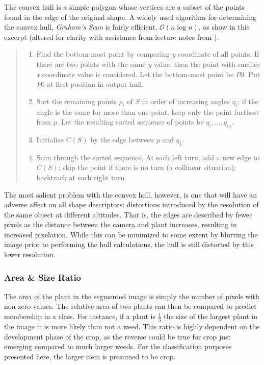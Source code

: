 \documentclass[letterpaper]{article}
\begin{document}
{{\begin{figure}[h!]
\end{figure}
The convex hull is a simple polygon whose vertices are a subset of the points found in the edge of the original shape. A widely used algorithm for determining the convex hull, \textit{Graham's Scan} is fairly efficient, $\mathcal{O}(n\log n)$, as \citeauthor{Klette2004-qz} show in this excerpt (altered for clarity with assistance from lecture notes from \citeauthor{Prosser1998-mi}). \parencite{Klette2004-qz}
\begin{quote}
\begin{enumerate}
	\item{Find the bottom-most point by comparing \textit{y} coordinate of all points. If there are two points with the same \textit{y} value, then the point with smaller \textit{x} coordinate value is considered. Let the bottom-most point be $P0$. Put $P0$ at first position in output hull.}
	\item{Sort the remaining points $p_i$ of $S$ in order of increasing angles $\eta_i$; if the angle is the same for more than one point, keep only the point furthest from $p$. Let the resulting sorted sequence of points be $q_i,..., q_m$.}
	\item{Initialize $C(S)$ by the edge between $p$ and $q_1$.}
	\item{Scan through the sorted sequence. At each left turn, add a new edge to $C(S)$; skip the point if there is no turn (a collinear situation); backtrack at each right turn.}
\end{enumerate}
\end{quote}
The most salient problem with the convex hull, however, is one that will have an adverse affect on all shape descriptors: distortions introduced by the resolution of the same object at different altitudes. That is, the edges are described by fewer pixels as the distance between the camera and plant increases, resulting in increased pixelation. While this can be minimized to some extent by blurring the image prior to performing the hull calculations, the hull is still distorted by this lower resolution.

\subsubsection{Area \& Size Ratio}
The area of the plant in the segmented image is simply the number of pixels with non-zero values. The relative area of two plants can then be compared to predict membership in a class. For instance, if a plant is $\frac{1}{3}$ the size of the largest plant in the image it is more likely than not a weed. This ratio is highly dependent on the development phase of the crop, as the reverse could be true for crop just emerging compared to much larger weeds. For the classification purposes presented here, the larger item is presumed to be crop.

}}
\end{document}
